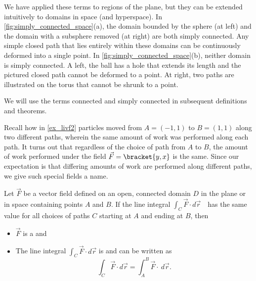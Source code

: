 
We have applied these terms to regions of the plane, but they can be extended intuitively to domains in space (and hyperspace). In \autoref{fig:simply_connected_space}(a), the domain bounded by the sphere (at left) and the domain with a subsphere removed (at right) are both simply connected. Any simple closed path that lies entirely within these domains can be continuously deformed into a single point. In \autoref{fig:simply_connected_space}(b), neither domain is simply connected. A left, the ball has a hole that extends its length and the pictured closed path cannot be deformed to a point. At right, two paths are illustrated on the torus that cannot be shrunk to a point. 

We will use the terms connected and simply connected in subsequent definitions and theorems.

Recall how in \autoref{ex_livf2} particles moved from $A = (-1,1)$ to $B = (1,1)$ along two different paths, wherein the same amount of work was performed along each path. It turns out that regardless of the choice of path from $A$ to $B$, the amount of work performed under the field $\vec F =\bracket{y, x}$ is the same. Since our expectation is that differing amounts of work are performed along different paths, we give such special fields a name. %

{Let $\vec F$ be a vector field defined on an open, connected domain $D$ in the plane or in space  containing points $A$ and $B$. If the line integral
$\int_C \vec F\cdot d\vec r$\ \ has the same value for all choices of paths $C$ starting at $A$ and ending at $B$, then
\begin{itemize}
	\item $\vec F$ is a  and
	\item	The line integral $\int_C \vec F\cdot d\vec r$ is  and can be written as
	\[\int_C \vec F\cdot d\vec r = \int_A^B \vec F\cdot \ d\vec r.\] 
\end{itemize}
}

